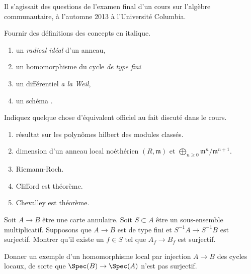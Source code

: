 \noindent
Il s'agissait des questions de l'examen final d'un
cours sur l'algèbre communautaire, à l'automne 2013 à l'Université Columbia.

\begin{exercise}[Definitions]
\label{exercise-definitions-fall-2013}
Fournir des définitions des concepts en italique.
\begin{enumerate}
\item un {\it radical idéal} d'un anneau,
\item un homomorphisme du cycle {\it de type fini}
\item un différentiel {\it a la Weil},
\item un schéma {\it}.
\end{enumerate}
\end{exercise}

\begin{exercise}[Results]
\label{exercise-results-fall-2013}
Indiquez quelque chose d'équivalent officiel au fait discuté dans
le cours.
\begin{enumerate}
\item résultat sur les polynômes hilbert des modules classés.
\item dimension d'un anneau local noéthérien $(R, \mathfrak m)$ et
$\bigoplus_{n \geq 0} \mathfrak m^n/\mathfrak m^{n + 1}$.
\item Riemann-Roch.
\item Clifford est théorème.
\item Chevalley est théorème.
\end{enumerate}
\end{exercise}

\begin{exercise}
\label{exercise-surjective-after-localization}
Soit $A \to B$ être une carte annulaire. Soit $S \subset A$ être un sous-ensemble
multiplicatif. Supposons que $A \to B$ est de type fini et $S^{-1}A \to
S^{-1}B$ est surjectif. Montrer qu'il existe un $f \in S$ tel que $A_f \to
B_f$ est surjectif.
\end{exercise}

\begin{exercise}
\label{exercise-injective-local-ring-map-not-surjective}
Donner un exemple d'un homomorphisme local par injection $A \to B$
des cycles locaux, de sorte que $\Spec(B) \to \Spec(A)$ n'est pas surjectif.
\end{exercise}

